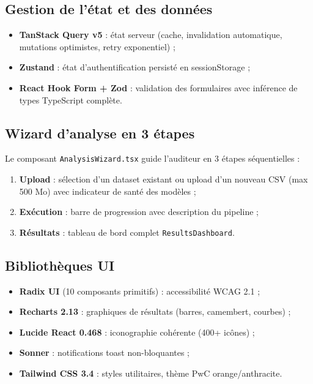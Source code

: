 \documentclass[12pt,a4paper,twoside]{report}
\theoremstyle{definition}
\begin{document}
\subsection{Gestion de l'état et des données}

\begin{itemize}
  \item \textbf{TanStack Query v5} : état serveur (cache, invalidation
    automatique, mutations optimistes, retry exponentiel) ;
  \item \textbf{Zustand} : état d'authentification persisté en sessionStorage ;
  \item \textbf{React Hook Form + Zod} : validation des formulaires avec
    inférence de types TypeScript complète.
\end{itemize}

\subsection{Wizard d'analyse en 3 étapes}

Le composant \texttt{AnalysisWizard.tsx} guide l'auditeur en 3 étapes séquentielles :
\begin{enumerate}
  \item \textbf{Upload} : sélection d'un dataset existant ou upload d'un nouveau CSV
    (max 500 Mo) avec indicateur de santé des modèles ;
  \item \textbf{Exécution} : barre de progression avec description du pipeline ;
  \item \textbf{Résultats} : tableau de bord complet \texttt{ResultsDashboard}.
\end{enumerate}

\subsection{Bibliothèques UI}

\begin{itemize}
  \item \textbf{Radix UI} (10 composants primitifs) : accessibilité WCAG 2.1 ;
  \item \textbf{Recharts 2.13} : graphiques de résultats (barres, camembert,
    courbes) ;
  \item \textbf{Lucide React 0.468} : iconographie cohérente (400+ icônes) ;
  \item \textbf{Sonner} : notifications toast non-bloquantes ;
  \item \textbf{Tailwind CSS 3.4} : styles utilitaires, thème PwC orange/anthracite.
\end{itemize}
\end{document}
